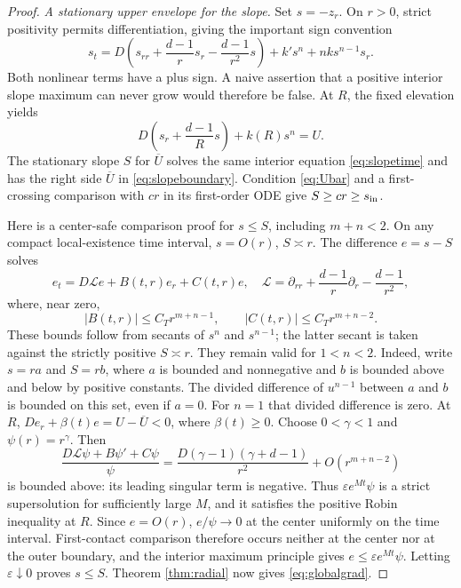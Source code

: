 \documentclass[11pt,a4paper]{article}
\theoremstyle{definition}\newtheorem{definition}[theorem]{Definition}
\theoremstyle{remark}\newtheorem{remark}[theorem]{Remark}
\begin{document}
\begin{proof}
\emph{A stationary upper envelope for the slope.} Set $s=-z_r$. On $r>0$, strict positivity permits differentiation, giving the important sign convention
\begin{equation}
 s_t=D\left(s_{rr}+\frac{d-1}{r}s_r-\frac{d-1}{r^2}s\right)
       +k's^n+nk s^{n-1}s_r.\label{eq:slopetime}
\end{equation}
Both nonlinear terms have a plus sign. A naive assertion that a positive interior slope maximum can never grow would therefore be false. At $R$, the fixed elevation yields
\begin{equation}
 D\left(s_r+\frac{d-1}{R}s\right)+k(R)s^n=U.\label{eq:slopeboundary}
\end{equation}
The stationary slope $S$ for $\overline U$ solves the same interior equation \eqref{eq:slopetime} and has the right side $\overline U$ in \eqref{eq:slopeboundary}. Condition \eqref{eq:Ubar} and a first-crossing comparison with $cr$ in its first-order ODE give $S\geq cr\geq s_{\rm in}$.

Here is a center-safe comparison proof for $s\leq S$, including $m+n<2$. On any compact local-existence time interval, $s=O(r)$, $S\asymp r$. The difference $e=s-S$ solves
\[
 e_t=D\mathcal L e+B(t,r)e_r+C(t,r)e,
 \quad\mathcal L=\partial_{rr}+\frac{d-1}{r}\partial_r-\frac{d-1}{r^2},
\]
where, near zero,
\[
 |B(t,r)|\leq C_T r^{m+n-1},\qquad
 |C(t,r)|\leq C_T r^{m+n-2}.
\]
These bounds follow from secants of $s^n$ and $s^{n-1}$; the latter secant is taken against the strictly positive $S\asymp r$. They remain valid for $1<n<2$. Indeed, write $s=ra$ and $S=rb$, where $a$ is bounded and nonnegative and $b$ is bounded above and below by positive constants. The divided difference of $u^{n-1}$ between $a$ and $b$ is bounded on this set, even if $a=0$. For $n=1$ that divided difference is zero. At $R$,
$De_r+\beta(t)e=U-\overline U<0$, where $\beta(t)\geq0$.
Choose $0<\gamma<1$ and $\psi(r)=r^\gamma$. Then
\[
 \frac{D\mathcal L\psi+B\psi'+C\psi}{\psi}
 =\frac{D(\gamma-1)(\gamma+d-1)}{r^2}+O(r^{m+n-2})
\]
is bounded above: its leading singular term is negative. Thus $\varepsilon e^{Mt}\psi$ is a strict supersolution for sufficiently large $M$, and it satisfies the positive Robin inequality at $R$. Since $e=O(r)$, $e/\psi\to0$ at the center uniformly on the time interval. First-contact comparison therefore occurs neither at the center nor at the outer boundary, and the interior maximum principle gives $e\leq\varepsilon e^{Mt}\psi$. Letting $\varepsilon\downarrow0$ proves $s\leq S$. Theorem \ref{thm:radial} now gives \eqref{eq:globalgrad}.


\end{proof}
\end{document}
